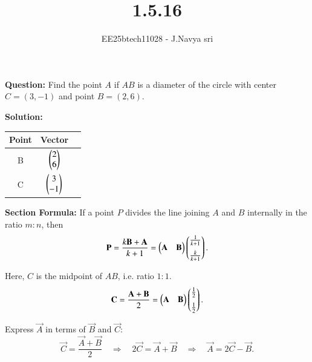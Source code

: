 \documentclass[journal]{IEEEtran}
\begin{document}

\vspace{3cm}


\title{1.5.16}
\author{EE25btech11028 - J.Navya sri}
{\let\newpage\relax\maketitle}

\renewcommand{\thefigure}{\theenumi}
\renewcommand{\thetable}{\theenumi}
\setlength{\intextsep}{10pt} %

\textbf{Question:} Find the point \(A\) if \(AB\) is a diameter of the circle with center \(C=(3,-1)\) and point \(B=(2,6)\).
\bigskip

\textbf{Solution:}
\bigskip

\begin{tabular}[12pt]{ |c| c| c|} 
    \hline
    {Point} & {Vector} \\ 
    \hline
    B & $ \begin{pmatrix}2 \\ 6\end{pmatrix} $  \\
    \hline
    C & $ \begin{pmatrix}3 \\ -1\end{pmatrix} $   \\
    \hline  
    \end{tabular}

\bigskip

\textbf{Section Formula:}
If a point \(P\) divides the line joining \(A\) and \(B\) internally in the ratio \(m:n\), then
\[
\mathbf{P} = \frac{k \mathbf{B} + \mathbf{A}}{k+1}
= \begin{pmatrix} \mathbf{A} & \mathbf{B} \end{pmatrix}
\begin{pmatrix}\frac{1}{k+1} \\[6pt] \frac{k}{k+1}\end{pmatrix}.
\]

Here, \(C\) is the midpoint of \(AB\), i.e. ratio \(1:1\).
\[
\mathbf{C} = \frac{\mathbf{A} + \mathbf{B}}{2}
= \begin{pmatrix} \mathbf{A} & \mathbf{B} \end{pmatrix}
\begin{pmatrix}\frac{1}{2} \\[6pt] \frac{1}{2}\end{pmatrix}.
\]

\bigskip

Express \(\vec{A}\) in terms of \(\vec{B}\) and \(\vec{C}\):
\[
\vec{C} = \frac{\vec{A} + \vec{B}}{2}
\quad \Rightarrow \quad
2 \vec{C} = \vec{A} + \vec{B}
\quad \Rightarrow \quad
\vec{A} = 2 \vec{C} - \vec{B}.
\]
\end{document}
